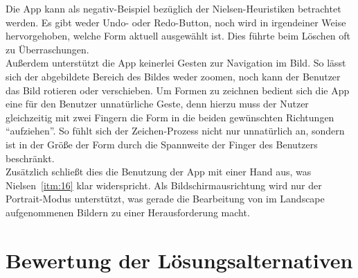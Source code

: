 Die App kann als negativ-Beispiel bezüglich der Nielsen-Heuristiken betrachtet werden. Es gibt weder Undo- oder Redo-Button, noch wird in irgendeiner Weise hervorgehoben, welche Form aktuell ausgewählt ist. Dies führte beim Löschen oft zu Überraschungen. \\

 Außerdem unterstützt die App keinerlei Gesten zur Navigation im Bild. So lässt sich der abgebildete Bereich des Bildes weder zoomen, noch kann der Benutzer das Bild rotieren oder verschieben. Um Formen zu zeichnen bedient sich die App eine für den Benutzer unnatürliche Geste, denn hierzu muss der Nutzer gleichzeitig mit zwei Fingern die Form in die beiden gewünschten Richtungen ``aufziehen''. So fühlt sich der Zeichen-Prozess nicht nur unnatürlich an, sondern ist in der Größe der Form durch die Spannweite der Finger des Benutzers beschränkt. \\
 
 Zusätzlich schließt dies die Benutzung der App mit einer Hand aus, was Nielsen~\autoref{itm:16} klar widerspricht. Als Bildschirmausrichtung wird nur der Portrait-Modus unterstützt, was gerade die Bearbeitung von im Landscape aufgenommenen Bildern zu einer Herausforderung macht. \\

\section{Bewertung der Lösungsalternativen}

